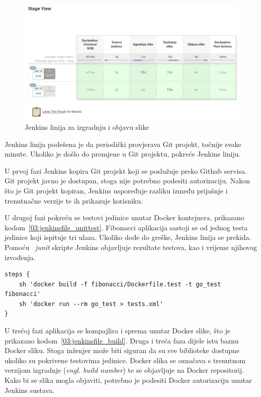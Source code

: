 \begin{figure}[h]
    \centering
    \includegraphics[width=\textwidth]{img/03/jenkins_pipeline.png}
    \caption{Jenkins linija za izgradnju i objavu slike}%
    \label{fig:03jenkins_pipeline}
\end{figure}

Jenkins linija podešena je da periodički provjerava Git projekt, točnije svake minute. Ukoliko je
došlo do promjene u Git projektu, pokreće Jenkins liniju.

U prvoj fazi Jenkins kopira Git projekt koji se poslužuje preko Github servisa. Git projekt javno je
dostupan, stoga nije potrebno podesiti autorizaciju. Nakon što je Git projekt kopiran, Jenkins
uspoređuje razliku između prijašnje i trenutnačne verzije te ih prikazuje korisniku.

U drugoj fazi pokreću se testovi jedinice unutar Docker kontejnera, prikazano
kodom~\ref{03:jenkinsfile_unittest}. Fibonacci aplikacija sastoji se od jednog testa jedinice koji
ispituje tri ulaza. Ukoliko dođe do greške, Jenkins linija se prekida.  Pomoću ~\textit{junit}
skripte Jenkins objavljuje rezultate testova, kao i vrijeme njihovog izvođenja.

\begin{lstlisting}[float=h]
steps {
    sh 'docker build -f fibonacci/Dockerfile.test -t go_test fibonacci'
    sh 'docker run --rm go_test > tests.xml'
}
\end{lstlisting}

U trećoj fazi aplikacija se kompajlira i sprema unutar Docker slike, što je prikazano
kodom~\ref{03:jenkinsfile_build}. Druga i treća faza dijele istu baznu Docker sliku. Stoga inženjer
može biti siguran da su sve biblioteke dostupne ukoliko su pokrivene testovima jedinice. Docker
slika se označava s trenutnom verzijom izgradnje (\textit{engl.  build number}) te se objavljuje na
Docker repositorij. Kako bi se slika mogla objaviti, potrebno je podesiti Docker autorizaciju unutar
Jenkins sustava.

